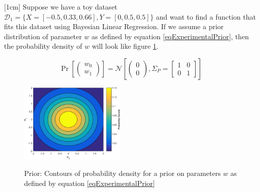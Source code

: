 \begin{mdframed}[hidealllines=true,backgroundcolor=lightgray!20]
[1cm]
Suppose we have a toy dataset $\mathcal{D}_{1} = \{X = [-0.5, 0.33, 0.66], Y = [0, 0.5, 0.5]\}$ and want to find a function that fits this dataset using Bayesian Linear Regression. If we assume a prior distribution of parameter $w$ as defined by equation \ref{eqExperimentalPrior}, then the probability density of $w$ will look like figure \ref{subFigpriorBLR}.

\begin{equation}\label{eqExperimentalPrior}
\Pr \left [\begin{pmatrix}
w_{0}\\ 
w_{1}
\end{pmatrix} \right ] = \mathcal{N}\left [ \begin{pmatrix}
0\\ 
0
\end{pmatrix}, \Sigma_{P} = \begin{bmatrix}
1 & 0\\ 
0 & 1
\end{bmatrix} \right ]
\end{equation}
\end{mdframed}

\begin{figure}[!ht]
  \centering
            \includegraphics[width=0.45\textwidth]
        {images/part1/priorBLR}
        \label{subFigpriorBLR}
        \caption{Prior: Contours of probability density for a prior on parameters $w$ as defined by equation \ref{eqExperimentalPrior}}
\end{figure}

